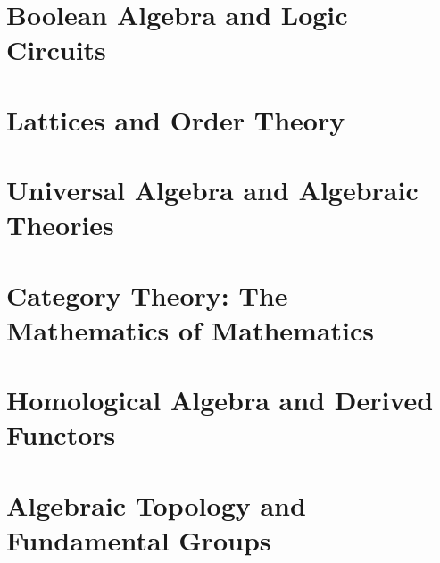 \chapter{Boolean Algebra and Logic Circuits}
\chapter{Lattices and Order Theory}
\chapter{Universal Algebra and Algebraic Theories}
\chapter{Category Theory: The Mathematics of Mathematics}
\chapter{Homological Algebra and Derived Functors}
\chapter{Algebraic Topology and Fundamental Groups}